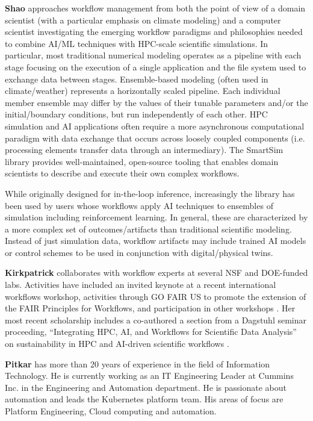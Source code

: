 {\bf Shao} approaches workflow management from both the point of view of a domain scientist (with a particular emphasis on climate modeling) and a computer scientist investigating the emerging workflow paradigms and philosophies needed to combine AI/ML techniques with HPC-scale scientific simulations. In particular, most traditional numerical modeling operates as a pipeline with each stage focusing on the execution of a single application and the file system used to exchange data between stages. Ensemble-based modeling (often used in climate/weather) represents a horizontally scaled pipeline. Each individual member ensemble may differ by the values of their tunable parameters and/or the initial/boundary conditions, but run independently of each other. HPC simulation and AI applications often require a more asynchronous computational paradigm with data exchange that occurs across loosely coupled components (i.e. processing elements transfer data through an intermediary). The SmartSim library provides well-maintained, open-source tooling that enables domain scientists to describe and execute their own complex workflows.

While originally designed for in-the-loop inference, increasingly the library has been used by users whose workflows apply AI techniques to ensembles of simulation including reinforcement learning. In general, these are characterized by a more complex set of outcomes/artifacts than traditional scientific modeling. Instead of just simulation data, workflow artifacts may include trained AI models or control schemes to be used in conjunction with digital/physical twins. 

{\bf Kirkpatrick} collaborates with workflow experts at several NSF and DOE-funded labs. Activities have included an invited keynote at a recent international workflows workshop, activities through GO FAIR US to promote the extension of the FAIR Principles for Workflows, and participation in other workshops \cite{kirkpatrick2023}. Her most recent scholarship includes a co-authored a section from a Dagstuhl seminar proceeding, ``Integrating HPC, AI, and Workflows for Scientific Data Analysis'' on sustainability in HPC and AI-driven scientific workflows \citep{badia2024integrating}.

{\bf Pitkar} has more than 20 years of experience in the field of Information Technology. He is currently working as an IT Engineering Leader at Cummins Inc. in the Engineering and Automation department. He is passionate about automation and leads the Kubernetes platform team. His areas of focus are Platform Engineering, Cloud computing and automation.


